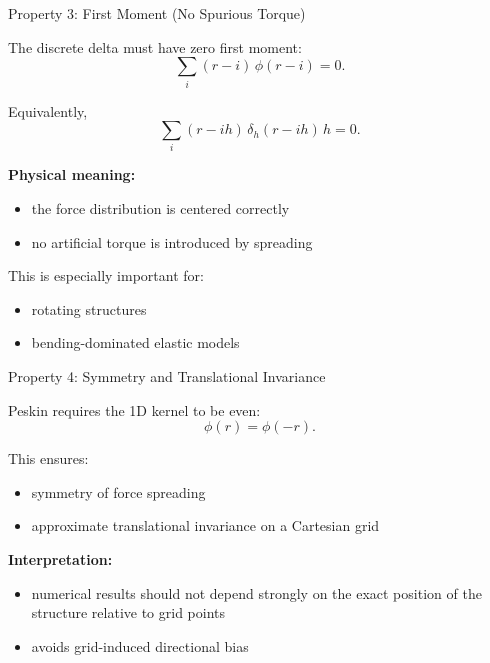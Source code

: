 \documentclass{beamer}
\begin{document}
\begin{frame}{Property 3: First Moment (No Spurious Torque)}

The discrete delta must have zero first moment:
\[
\sum_i (r-i)\,\phi(r-i) = 0.
\]

\medskip

Equivalently,
\[
\sum_i (r-ih)\,\delta_h(r-ih)\,h = 0.
\]

\medskip

\textbf{Physical meaning:}
\begin{itemize}
    \item the force distribution is centered correctly
    \item no artificial torque is introduced by spreading
\end{itemize}

\medskip

This is especially important for:
\begin{itemize}
    \item rotating structures
    \item bending-dominated elastic models
\end{itemize}

\end{frame}

\begin{frame}{Property 4: Symmetry and Translational Invariance}

Peskin requires the 1D kernel to be even:
\[
\phi(r) = \phi(-r).
\]

\medskip

This ensures:
\begin{itemize}
    \item symmetry of force spreading
    \item approximate translational invariance on a Cartesian grid
\end{itemize}

\medskip

\textbf{Interpretation:}
\begin{itemize}
    \item numerical results should not depend strongly on the exact
          position of the structure relative to grid points
    \item avoids grid-induced directional bias
\end{itemize}

\end{frame}
\end{document}
